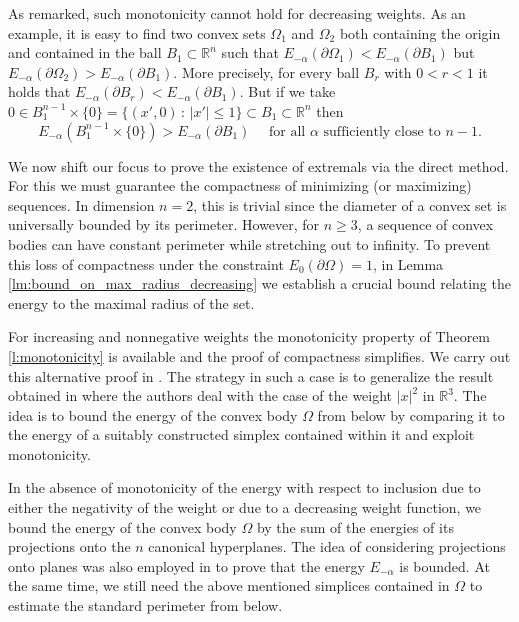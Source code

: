 \documentclass[10pt,leqno]{amsart}
\newcommand{\R}[0]{\mathbb{R}}
\newcommand{\p}{\partial}
\numberwithin{Theorem}{section}
\theoremstyle{definition}
\theoremstyle{remark}
\numberwithin{equation}{section}
\numberwithin{equation}{section}
\begin{document}
As remarked, such monotonicity cannot hold for decreasing weights. As an example, it is easy to find two convex sets $\Omega_1$ and $\Omega_2$ both containing the origin and contained in the ball $B_1\subset\R^n$ such that $E_{-\alpha}(\p \Omega_1)<E_{-\alpha}(\p B_1)$ but $E_{-\alpha}(\p \Omega_2)>E_{-\alpha}(\p B_1)$. More precisely, for every ball $B_{r}$ with $0<r<1$ it holds that $E_{-\alpha}(\p B_{r}) < E_{-\alpha}( \p B_{1})$. But if we take $0 \in B_{1}^{n-1} \times \{ 0\} =\{ (x',0) \, : \, |x'|\leq 1 \}\subset B_1 \subset \R^n$ then 
\[
E_{-\alpha}( B_{1}^{n-1} \times \{ 0\} ) > E_{-\alpha}( \p B_{1}) \quad \text{ for all $\alpha$ sufficiently close to $n-1$}.
\]

We now shift our focus to prove the existence of extremals via the direct method. For this we must guarantee the compactness of minimizing (or maximizing) sequences. In dimension $n=2$, this is trivial since the diameter of a convex set is universally bounded by its perimeter. However, for $n \ge 3$, a sequence of convex bodies can have constant perimeter while stretching out to infinity. To prevent this loss of compactness under the constraint $E_0(\p \Omega)=1$, in Lemma \ref{lm:bound_on_max_radius_decreasing} we establish a crucial bound relating the  energy to the maximal radius of the set.  

For increasing and nonnegative weights the monotonicity property of Theorem \ref{l:monotonicity} is available and the proof of compactness simplifies. We carry out this alternative proof in \cite{CG_part2}. 
The strategy in such a case is to generalize the result obtained in \cite[Lemma 8]{FreitasLaugesenLiddell} where the authors deal with the case of the weight $|x|^2$ in $\R^3$.
The idea is to bound the energy of the convex body $\Omega$ from below by comparing it to the energy of a suitably constructed simplex contained within it and exploit monotonicity.



In the absence of monotonicity of the energy with respect to inclusion due to either the negativity of the weight or due to a decreasing weight function, we bound the energy of the convex body $\Omega$ by the sum of the energies of its projections onto the $n$ canonical hyperplanes. 
The idea of considering projections onto planes was also employed in \cite{Csato2024} to prove that the energy $E_{-\alpha}$ is bounded. At the same time, we still need the above mentioned simplices contained in $\Omega$ to estimate the standard perimeter from below. 
\end{document}
